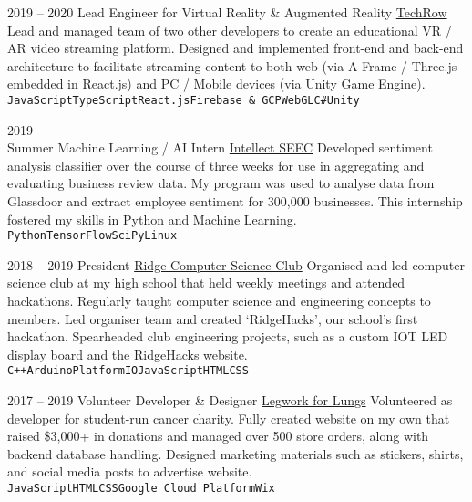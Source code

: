 \documentclass[9pt]{developercv} %
\begin{document}
\begin{entrylist}
	\entry
	{2019 -- 2020}
	{Lead Engineer for Virtual Reality \& Augmented Reality}
	{\href{https://www.techrow.org}{TechRow}}
	{
		Lead and managed team of two other developers to create an educational VR / AR video streaming platform.
		Designed and implemented front-end and back-end architecture to facilitate streaming content to both web (via A-Frame / Three.js embedded in React.js) and PC / Mobile devices (via Unity Game Engine).
		\\
		\texttt{JavaScript}\slashsep\texttt{TypeScript}\slashsep\texttt{React.js}\slashsep\texttt{Firebase \& GCP}\slashsep\texttt{WebGL}\slashsep\texttt{C\#}\slashsep\texttt{Unity}
	}

	\entry
	{
		2019
		\\
		\footnotesize{Summer}
	}
	{Machine Learning / AI Intern}
	{\href{https://intellectseec.com}{Intellect SEEC}}
	{
		Developed sentiment analysis classifier over the course of three
		weeks for use in aggregating and evaluating business review data.
		My program was used to analyse data from Glassdoor and extract
		employee sentiment for 300,000 businesses. This internship fostered my skills in
		Python and Machine Learning.
		\\ \texttt{Python}\slashsep\texttt{TensorFlow}\slashsep\texttt{SciPy}\slashsep\texttt{Linux}
	}

	\entry
	{2018 -- 2019}
	{President}
	{\href{https://ridgecompsci.club}{Ridge Computer Science Club}}
	{
		Organised and led computer science club at my high school that held weekly meetings and attended hackathons.
		Regularly taught computer science and engineering concepts to members.
		Led organiser team and created ‘RidgeHacks’, our school’s first hackathon.
		Spearheaded club engineering projects, such as a custom IOT LED display board and the RidgeHacks website.
		\\
		\texttt{C++}\slashsep\texttt{Arduino}\slashsep\texttt{PlatformIO}\slashsep\texttt{JavaScript}\slashsep\texttt{HTML}\slashsep\texttt{CSS}
	}

	\entry
	{2017 -- 2019}
	{Volunteer Developer \& Designer}
	{\href{http://www.legworkforlungs.org}{Legwork for Lungs}}
	{
		Volunteered as developer for student-run cancer charity.
		Fully created website on my own that raised \$3,000+ in donations and managed over 500 store orders, along with backend database handling.
		Designed marketing materials such as stickers, shirts, and social media posts to advertise website.
		\\
		\texttt{JavaScript}\slashsep\texttt{HTML}\slashsep\texttt{CSS}\slashsep\texttt{Google Cloud Platform}\slashsep\texttt{Wix}
	}


\end{entrylist}
\end{document}
